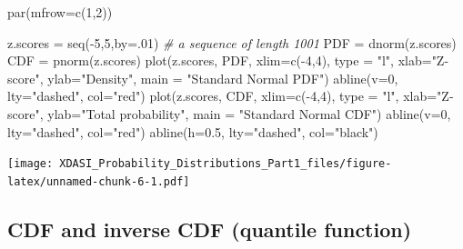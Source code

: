 \documentclass[
]{article}
\newenvironment{Shaded}{\begin{snugshade}}{\end{snugshade}}
\newcommand{\AttributeTok}[1]{\textcolor[rgb]{0.77,0.63,0.00}{#1}}
\newcommand{\CommentTok}[1]{\textcolor[rgb]{0.56,0.35,0.01}{\textit{#1}}}
\newcommand{\DecValTok}[1]{\textcolor[rgb]{0.00,0.00,0.81}{#1}}
\newcommand{\FloatTok}[1]{\textcolor[rgb]{0.00,0.00,0.81}{#1}}
\newcommand{\FunctionTok}[1]{\textcolor[rgb]{0.00,0.00,0.00}{#1}}
\newcommand{\NormalTok}[1]{#1}
\newcommand{\OtherTok}[1]{\textcolor[rgb]{0.56,0.35,0.01}{#1}}
\newcommand{\SpecialCharTok}[1]{\textcolor[rgb]{0.00,0.00,0.00}{#1}}
\newcommand{\StringTok}[1]{\textcolor[rgb]{0.31,0.60,0.02}{#1}}
\begin{document}
\begin{Shaded}
\begin{Highlighting}[]
\FunctionTok{par}\NormalTok{(}\AttributeTok{mfrow=}\FunctionTok{c}\NormalTok{(}\DecValTok{1}\NormalTok{,}\DecValTok{2}\NormalTok{))}

\NormalTok{z.scores }\OtherTok{=} \FunctionTok{seq}\NormalTok{(}\SpecialCharTok{{-}}\DecValTok{5}\NormalTok{,}\DecValTok{5}\NormalTok{,}\AttributeTok{by=}\NormalTok{.}\DecValTok{01}\NormalTok{)         }\CommentTok{\# a sequence of length 1001}
\NormalTok{PDF      }\OtherTok{=} \FunctionTok{dnorm}\NormalTok{(z.scores)}
\NormalTok{CDF      }\OtherTok{=} \FunctionTok{pnorm}\NormalTok{(z.scores)}
\FunctionTok{plot}\NormalTok{(z.scores, PDF,}
     \AttributeTok{xlim=}\FunctionTok{c}\NormalTok{(}\SpecialCharTok{{-}}\DecValTok{4}\NormalTok{,}\DecValTok{4}\NormalTok{),}
     \AttributeTok{type =} \StringTok{"l"}\NormalTok{,}
     \AttributeTok{xlab=}\StringTok{"Z{-}score"}\NormalTok{, }\AttributeTok{ylab=}\StringTok{"Density"}\NormalTok{,}
     \AttributeTok{main =} \StringTok{"Standard Normal PDF"}\NormalTok{)}
\FunctionTok{abline}\NormalTok{(}\AttributeTok{v=}\DecValTok{0}\NormalTok{, }\AttributeTok{lty=}\StringTok{"dashed"}\NormalTok{, }\AttributeTok{col=}\StringTok{"red"}\NormalTok{)}
\FunctionTok{plot}\NormalTok{(z.scores, CDF,}
     \AttributeTok{xlim=}\FunctionTok{c}\NormalTok{(}\SpecialCharTok{{-}}\DecValTok{4}\NormalTok{,}\DecValTok{4}\NormalTok{),}
     \AttributeTok{type =} \StringTok{"l"}\NormalTok{,}
     \AttributeTok{xlab=}\StringTok{"Z{-}score"}\NormalTok{, }\AttributeTok{ylab=}\StringTok{"Total probability"}\NormalTok{,}
     \AttributeTok{main =} \StringTok{"Standard Normal CDF"}\NormalTok{)}
\FunctionTok{abline}\NormalTok{(}\AttributeTok{v=}\DecValTok{0}\NormalTok{, }\AttributeTok{lty=}\StringTok{"dashed"}\NormalTok{, }\AttributeTok{col=}\StringTok{"red"}\NormalTok{)}
\FunctionTok{abline}\NormalTok{(}\AttributeTok{h=}\FloatTok{0.5}\NormalTok{, }\AttributeTok{lty=}\StringTok{"dashed"}\NormalTok{, }\AttributeTok{col=}\StringTok{"black"}\NormalTok{)}
\end{Highlighting}
\end{Shaded}

\texttt{[image: XDASI\_Probability\_Distributions\_Part1\_files/figure-latex/unnamed-chunk-6-1.pdf]}

\hypertarget{cdf-and-inverse-cdf-quantile-function}{%
\subsection{CDF and inverse CDF (quantile
function)}\label{cdf-and-inverse-cdf-quantile-function}}
\end{document}
